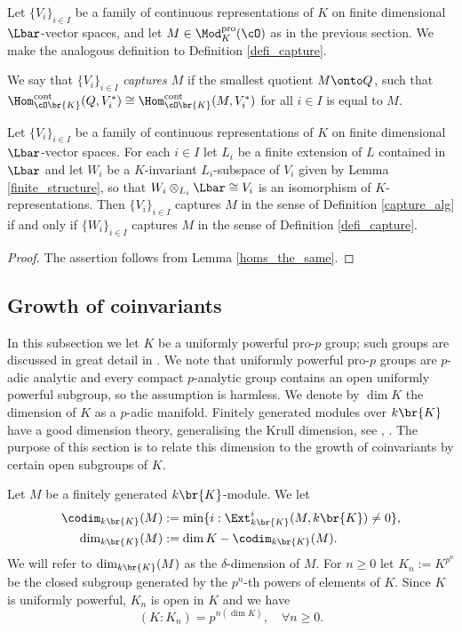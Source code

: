 Let $\{V_i\}_{i\in I}$ be a family of
continuous representations
of $K$ on finite dimensional $\Lbar$-vector spaces, and let $M\in \Mod^{\mathrm{pro}}_K(\cO)$ as in the previous section.
We make the analogous definition to Definition \ref{defi_capture}.
\begin{defi}\label{capture_alg} We say
that $\{V_i\}_{i\in I}$ \textit{captures $M$} if the smallest quotient
$M\onto Q$, such that
$\Hom_{\cO\br{K}}^{\rm cont}(Q, V_i^*)\cong \Hom_{\cO\br{K}}^{\rm cont}(M, V_i^*)$ for all $i\in I$ is equal to $M$.
\end{defi}

\begin{lem} Let $\{V_i\}_{i\in I}$ be a family of continuous representations of $K$ on finite dimensional $\Lbar$-vector spaces. For each $i\in I$ let $L_i$ be a finite extension of $L$ contained in $\Lbar$ and let $W_i$ be a $K$-invariant
$L_i$-subspace of $V_i$ given by Lemma \ref{finite_structure}, so that $W_i\otimes_{L_i} \Lbar \cong V_i$ is an isomorphism of $K$-representations. Then $\{V_i\}_{i\in I}$ captures $M$ in the sense of Definition \ref{capture_alg} if and
only if $\{W_i\}_{i\in I}$ captures $M$ in the sense of Definition \ref{defi_capture}.
\end{lem}

\begin{proof} The assertion follows from Lemma \ref{homs_the_same}.
\end{proof}

\subsection{Growth of coinvariants}\label{sec_growth}

In this subsection we let $K$ be a uniformly powerful pro-$p$ group; such groups are discussed in great detail in \cite[\S 4]{analytic}. We note that uniformly powerful pro-$p$ groups are $p$-adic analytic and every compact $p$-analytic group contains an open uniformly powerful subgroup, so the assumption is harmless. We denote by $\dim K$ the dimension of $K$ as a $p$-adic manifold. Finitely generated modules over $k\br{K}$ have a good dimension theory,
generalising the Krull dimension, see \cite{ardakov_brown}, \cite{venjakob}. The purpose of this section is to relate this dimension to the growth of coinvariants by certain open
subgroups of $K$.

Let $M$ be a finitely generated $k\br{K}$-module. We let
\begin{align*}
\codim_{k\br{K}}(M)&:= \min\{i: \Ext^i_{k\br{K}}(M, k\br{K})\neq 0\},
\\
\dim_{k\br{K}}(M)&:= \dim K-\codim_{k\br{K}}(M).
\end{align*}
We will refer to $\dim_{k\br{K}}(M)$ as the $\delta$-dimension of $M$. For $n\ge 0$ let $K_n:=K^{p^n}$ be the closed subgroup generated by the $p^n$-th powers of elements of $K$. Since $K$ is uniformly powerful, $K_n$ is open in $K$ and we have
\begin{equation}\label{index_pro_p}
(K:K_n)= p^{n(\dim K)}, \quad \forall n\ge 0.
\end{equation}

